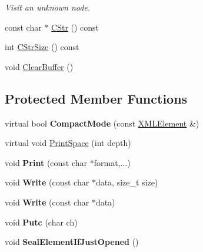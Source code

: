 \begin{DoxyCompactItemize}
\begin{DoxyCompactList}\small\item\em Visit an unknown node. \end{DoxyCompactList}\item 
const char $\ast$ \hyperlink{classCPlantBox_1_1tinyxml2_1_1XMLPrinter_a5cc0b2a78c8e09105f2ba576bc471c3d}{C\+Str} () const
\item 
int \hyperlink{classCPlantBox_1_1tinyxml2_1_1XMLPrinter_ab89d2702a07147d297b1ea373fd9007f}{C\+Str\+Size} () const
\item 
void \hyperlink{classCPlantBox_1_1tinyxml2_1_1XMLPrinter_a8163bb2e370a2d9b0ac3a209122fef93}{Clear\+Buffer} ()
\end{DoxyCompactItemize}
\subsection*{Protected Member Functions}
\begin{DoxyCompactItemize}
\item 
\mbox{\label{classCPlantBox_1_1tinyxml2_1_1XMLPrinter_a1f51e7d386bb2b9688abe480c25e0a55}} 
virtual bool {\bfseries Compact\+Mode} (const \hyperlink{classCPlantBox_1_1tinyxml2_1_1XMLElement}{X\+M\+L\+Element} \&)
\item 
virtual void \hyperlink{classCPlantBox_1_1tinyxml2_1_1XMLPrinter_a0c59d58a53aa6ed55609e831df4a9ae5}{Print\+Space} (int depth)
\item 
\mbox{\label{classCPlantBox_1_1tinyxml2_1_1XMLPrinter_a66065797481a616fff8e0711c69311d6}} 
void {\bfseries Print} (const char $\ast$format,...)
\item 
\mbox{\label{classCPlantBox_1_1tinyxml2_1_1XMLPrinter_a072c12e829be2288f61b212b8e2e8d88}} 
void {\bfseries Write} (const char $\ast$data, size\+\_\+t size)
\item 
\mbox{\label{classCPlantBox_1_1tinyxml2_1_1XMLPrinter_a0ad2f5cb3cab0012412af46c180bf996}} 
void {\bfseries Write} (const char $\ast$data)
\item 
\mbox{\label{classCPlantBox_1_1tinyxml2_1_1XMLPrinter_a6681c18b63200daf2adc65fad29b492a}} 
void {\bfseries Putc} (char ch)
\item 
\mbox{\label{classCPlantBox_1_1tinyxml2_1_1XMLPrinter_a6f681544594163d71e39540ca4dffb02}} 
void {\bfseries Seal\+Element\+If\+Just\+Opened} ()
\end{DoxyCompactItemize}
